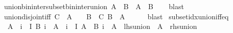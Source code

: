 \begin{isabellebody}
\endisatagproof
{\isafoldproof}%
%
\isadelimproof
\isanewline
%
\endisadelimproof
\isanewline
{}\isamarkupfalse%
\ union{\isacharunderscore}{\kern0pt}bin{\isacharunderscore}{\kern0pt}inter{\isacharunderscore}{\kern0pt}subset{\isacharunderscore}{\kern0pt}bin{\isacharunderscore}{\kern0pt}inter{\isacharunderscore}{\kern0pt}union{\isacharcolon}{\kern0pt}\ {\isachardoublequoteopen}{\isasymUnion}{\isacharparenleft}{\kern0pt}A\ {\isasyminter}\ B{\isacharparenright}{\kern0pt}\ {\isasymsubseteq}\ {\isasymUnion}A\ {\isasyminter}\ {\isasymUnion}B{\isachardoublequoteclose}\isanewline
%
\isadelimproof
\ \ %
\endisadelimproof
%
\isatagproof
{}\isamarkupfalse%
\ blast%
\endisatagproof
{\isafoldproof}%
%
\isadelimproof
\isanewline
%
\endisadelimproof
\isanewline
{}\isamarkupfalse%
\ union{\isacharunderscore}{\kern0pt}{\isacharunderscore}{\kern0pt}disjoint{\isacharunderscore}{\kern0pt}iff{\isacharcolon}{\kern0pt}\ {\isachardoublequoteopen}{\isasymUnion}C\ {\isasyminter}\ A\ {\isacharequal}{\kern0pt}\ {\isacharbraceleft}{\kern0pt}{\isacharbraceright}{\kern0pt}\ {\isasymlongleftrightarrow}\ {\isacharparenleft}{\kern0pt}{\isasymforall}B\ {\isasymin}\ C{\isachardot}{\kern0pt}\ B\ {\isasyminter}\ A\ {\isacharequal}{\kern0pt}\ {\isacharbraceleft}{\kern0pt}{\isacharbraceright}{\kern0pt}{\isacharparenright}{\kern0pt}{\isachardoublequoteclose}\isanewline
%
\isadelimproof
\ \ %
\endisadelimproof
%
\isatagproof
{}\isamarkupfalse%
\ blast%
\endisatagproof
{\isafoldproof}%
%
\isadelimproof
\isanewline
%
\endisadelimproof
\isanewline
{}\isamarkupfalse%
\ subset{\isacharunderscore}{\kern0pt}idx{\isacharunderscore}{\kern0pt}union{\isacharunderscore}{\kern0pt}iff{\isacharunderscore}{\kern0pt}eq{\isacharcolon}{\kern0pt}\isanewline
\ \ {\isachardoublequoteopen}A\ {\isasymsubseteq}\ {\isacharparenleft}{\kern0pt}{\isasymUnion}i\ {\isasymin}\ I{\isachardot}{\kern0pt}\ B\ i{\isacharparenright}{\kern0pt}\ {\isasymlongleftrightarrow}\ A\ {\isacharequal}{\kern0pt}\ {\isacharparenleft}{\kern0pt}{\isasymUnion}i\ {\isasymin}\ I{\isachardot}{\kern0pt}\ A\ {\isasyminter}\ B\ i{\isacharparenright}{\kern0pt}{\isachardoublequoteclose}\ {\isacharparenleft}{\kern0pt}\ {\isachardoublequoteopen}A\ {\isasymsubseteq}\ {\isacharquery}{\kern0pt}lhs{\isacharunderscore}{\kern0pt}union\ {\isasymlongleftrightarrow}\ A\ {\isacharequal}{\kern0pt}\ {\isacharquery}{\kern0pt}rhs{\isacharunderscore}{\kern0pt}union{\isachardoublequoteclose}{\isacharparenright}{\kern0pt}\isanewline
%
\isadelimproof
%
\endisadelimproof
%
\isatagproof
{}\isamarkupfalse%

\end{isabellebody}
